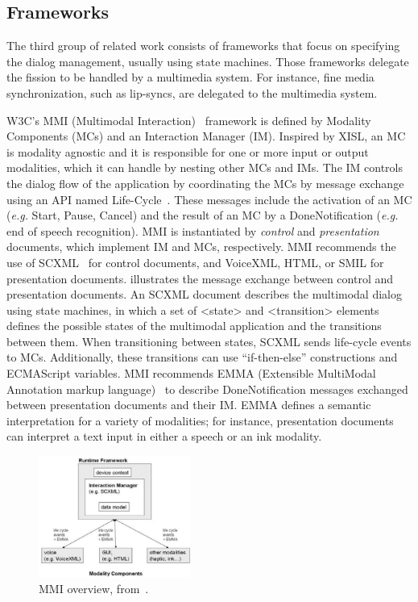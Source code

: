 \subsection{Frameworks}
\label{sec:state:frameworks}

The third group of related work consists of frameworks that focus on specifying
the dialog management, usually using state machines. Those frameworks delegate
the fission to be handled by a multimedia system. For instance, fine media
synchronization, such as lip-syncs, are delegated to the multimedia system.

W3C’s MMI (Multimodal Interaction)~\cite{w3c_multimodal_2003} framework is
defined by Modality Components (MCs) and an Interaction Manager (IM). Inspired
by XISL, an MC is modality agnostic and it is responsible for one or more input
or output modalities, which it can handle by nesting other MCs and IMs. The IM
controls the dialog flow of the application by coordinating the MCs by message
exchange using an API named Life-Cycle~\cite{w3c_multimodal_2012}. These
messages include the activation of an MC (\textit{e.g.} Start, Pause, Cancel) and the
result of an MC by a DoneNotification (\textit{e.g.} end of speech recognition). MMI is
instantiated by \textit{control} and
\textit{presentation} documents, which implement IM and MCs, respectively. MMI
recommends the use of SCXML~\cite{w3c_state_2012} for control documents, and
VoiceXML, HTML, or SMIL for presentation documents.  illustrates
the message exchange between control and presentation documents. An SCXML
document describes the multimodal dialog using state machines, in which a set of
<state> and <transition> elements defines the possible states of the multimodal
application and the transitions between them. When transitioning between states,
SCXML sends life-cycle events to MCs. Additionally, these transitions can use
“if-then-else” constructions and ECMAScript variables. MMI recommends EMMA
(Extensible MultiModal Annotation markup language)~\cite{w3c_emma:_2009} to
describe DoneNotification messages exchanged between presentation documents and
their IM. EMMA defines a semantic interpretation for a variety of modalities;
for instance, presentation documents can interpret a text input in either a
speech or an ink modality.

\begin{figure}[!ht]
\begin{center}
	\includegraphics[width=5cm, keepaspectratio]{img/img7.png}
	\caption[MMI overview]{MMI overview, from~\cite{dahl_standards_2009}.}
	\label{fig:mmi}
	\captionvspace
\end{center}
\end{figure}

